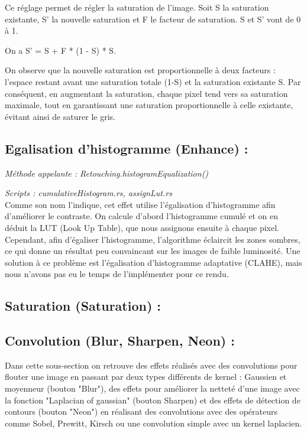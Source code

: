 Ce réglage permet de régler la saturation de l'image. Soit S la saturation existante, S' la nouvelle saturation et F le facteur de saturation. S et S' vont de 0 à 1.

On a S' = S + F * (1 - S) * S. 

On observe que la nouvelle saturation est proportionnelle à deux facteurs : l'espace restant avant une saturation totale (1-S) et la saturation existante S.
Par conséquent, en augmentant la saturation, chaque pixel tend vers sa saturation maximale, tout en garantissant une saturation proportionnelle à celle existante, évitant ainsi de saturer le gris.

\subsection{Egalisation d'histogramme (Enhance) :}

\emph{Méthode appelante : Retouching.histogramEqualization()}

\emph{Scripts : cumulativeHistogram.rs, assignLut.rs} 
\\

Comme son nom l'indique, cet effet utilise l'égalisation d'histogramme afin d'améliorer le contraste.
On calcule d'abord l'histogramme cumulé et on en déduit la LUT (Look Up Table), que nous assignons ensuite à chaque pixel.
\\

Cependant, afin d'égaliser l'histogramme, l'algorithme éclaircit les zones sombres, ce qui donne un résultat peu convaincant sur les images de faible luminosité.
Une solution à ce problème est l'égalisation d'histogramme adaptative (CLAHE), mais nous n'avons pas eu le temps de l'implémenter pour ce rendu.

\subsection{Saturation (Saturation) :}





\subsection{Convolution (Blur, Sharpen, Neon) :}

    Dans cette sous-section on retrouve des effets réalisés avec des convolutions pour flouter une image en passant par deux types différents de kernel : Gaussien et moyenneur
    (bouton "Blur"), des effets pour améliorer la netteté d'une image avec la fonction "Laplacian of gaussian" (bouton Sharpen) et des effets de 
    détection de contours (bouton "Neon") en réalisant des convolutions avec des opérateurs comme Sobel, Prewitt, Kirsch ou une convolution simple avec un kernel
    laplacien.

